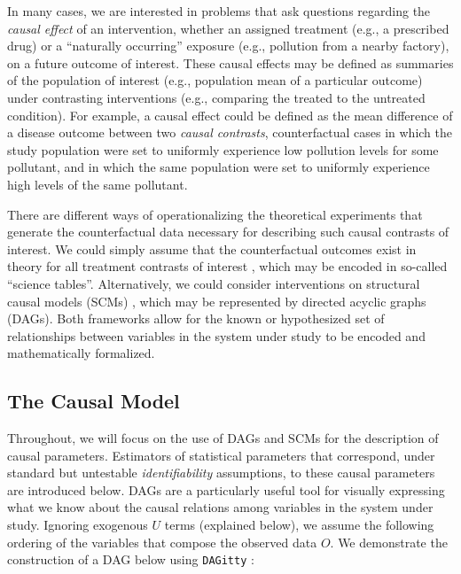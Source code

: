 \documentclass[
  12pt, krantz2,
]{krantz}
\newcommand{\passthrough}[1]{#1}
\newcommand{\1}{\mathbbm{1}}
\theoremstyle{definition}
\theoremstyle{definition}
\theoremstyle{definition}
\theoremstyle{definition}
\theoremstyle{remark}
\begin{document}
In many cases, we are interested in problems that ask questions regarding the
\emph{causal effect} of an intervention, whether an assigned treatment (e.g., a
prescribed drug) or a ``naturally occurring'' exposure (e.g., pollution from a
nearby factory), on a future outcome of interest. These causal effects may be
defined as summaries of the population of interest (e.g., population mean of a
particular outcome) under contrasting interventions (e.g., comparing the treated
to the untreated condition). For example, a causal effect could be defined as
the mean difference of a disease outcome between two \emph{causal contrasts},
counterfactual cases in which the study population were set to uniformly
experience low pollution levels for some pollutant, and in which the same
population were set to uniformly experience high levels of the same pollutant.

There are different ways of operationalizing the theoretical experiments that
generate the counterfactual data necessary for describing such causal contrasts
of interest. We could simply assume that the counterfactual outcomes exist in
theory for all treatment contrasts of interest \citep{neyman1938contribution, rubin2005causal, imbens2015causal}, which may be encoded in so-called ``science
tables''. Alternatively, we could consider interventions on structural causal
models (SCMs) \citep{pearl1995causal, pearl2009causality}, which may be represented
by directed acyclic graphs (DAGs). Both frameworks allow for the known or
hypothesized set of relationships between variables in the system under study to
be encoded and mathematically formalized.

\hypertarget{the-causal-model}{%
\subsection*{The Causal Model}\label{the-causal-model}}


Throughout, we will focus on the use of DAGs and SCMs for the description of
causal parameters. Estimators of statistical parameters that correspond, under
standard but untestable \emph{identifiability} assumptions, to these causal
parameters are introduced below. DAGs are a particularly useful tool for
visually expressing what we know about the causal relations among variables in
the system under study. Ignoring exogenous \(U\) terms (explained below), we
assume the following ordering of the variables that compose the observed data
\(O\). We demonstrate the construction of a DAG below using \passthrough{\lstinline!DAGitty!}
\citep{textor2011dagitty}:
\end{document}
